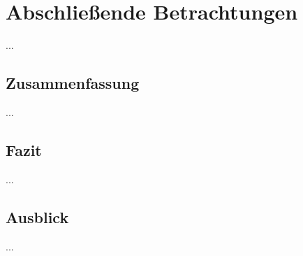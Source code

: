 \chapter{Abschließende Betrachtungen}

...


\section{Zusammenfassung}

...


\section{Fazit}

...

\section{Ausblick}

...
